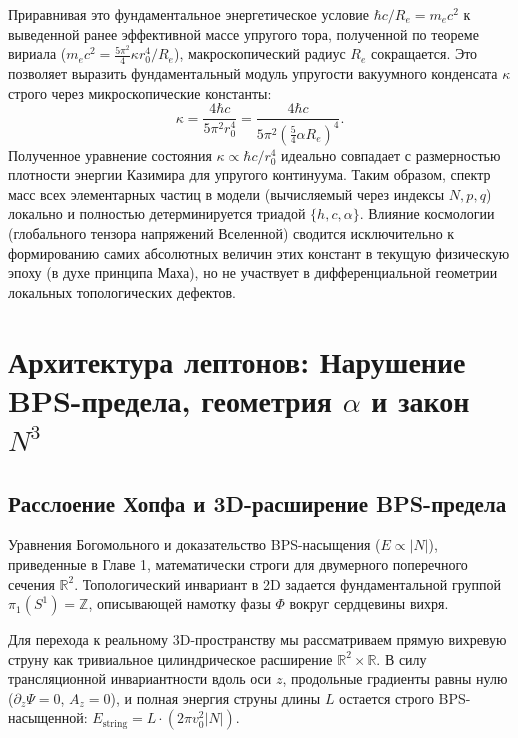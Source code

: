 \documentclass[11pt,a4paper]{article}
\begin{document}
Приравнивая это фундаментальное энергетическое условие $\hbar c / R_e = m_e c^2$ к выведенной ранее эффективной массе упругого тора, полученной по теореме вириала ($m_e c^2 = \frac{5\pi^2}{4} \kappa r_0^4 / R_e$), макроскопический радиус $R_e$ сокращается. Это позволяет выразить фундаментальный модуль упругости вакуумного конденсата $\kappa$ строго через микроскопические константы:
\begin{equation}
	\kappa = \frac{4 \hbar c}{5\pi^2 r_0^4} = \frac{4 \hbar c}{5\pi^2 \left( \frac{5}{4}\alpha R_e \right)^4}.
\end{equation}
Полученное уравнение состояния $\kappa \propto \hbar c / r_0^4$ идеально совпадает с размерностью плотности энергии Казимира для упругого континуума. 
Таким образом, спектр масс всех элементарных частиц в модели (вычисляемый через индексы $N, p, q$) локально и полностью детерминируется триадой $\{h, c, \alpha\}$. Влияние космологии (глобального тензора напряжений Вселенной) сводится исключительно к формированию самих абсолютных величин этих констант в текущую физическую эпоху (в духе принципа Маха), но не участвует в дифференциальной геометрии локальных топологических дефектов.
	
\section{Архитектура лептонов: Нарушение BPS-предела, геометрия $\alpha$ и закон $N^3$}
	
\subsection{Расслоение Хопфа и 3D-расширение BPS-предела}
Уравнения Богомольного и доказательство BPS-насыщения ($E \propto |N|$), приведенные в Главе 1, математически строги для двумерного поперечного сечения $\mathbb{R}^2$. Топологический инвариант в 2D задается фундаментальной группой $\pi_1(S^1) = \mathbb{Z}$, описывающей намотку фазы $\Phi$ вокруг сердцевины вихря. 

Для перехода к реальному 3D-пространству мы рассматриваем прямую вихревую струну как тривиальное цилиндрическое расширение $\mathbb{R}^2 \times \mathbb{R}$. В силу трансляционной инвариантности вдоль оси $z$, продольные градиенты равны нулю ($\partial_z \Psi = 0$, $A_z = 0$), и полная энергия струны длины $L$ остается строго BPS-насыщенной: $E_{\text{string}} = L \cdot (2\pi v_0^2 |N|)$. 
\end{document}
